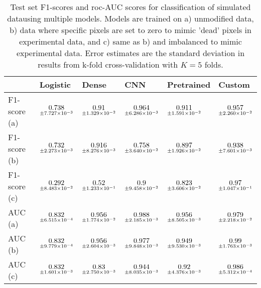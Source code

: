 \begin{table}
\centering
\caption{
Test set F1-scores and roc-AUC scores for classification of simulated datausing multiple models.
Models are trained on a) unmodified data, b) data where specific pixels are set to zero to mimic
'dead' pixels in experimental data, and c) same as b) and imbalanced to mimic experimental data. 
Error estimates are the standard deviation in results from k-fold cross-validation with $K=5$ folds.
}
\label{tab:classification-simulated-all-f1-auc}
\begin{tabular}{llllll}
\toprule
{} &                                            Logistic &                                               Dense &                                       CNN &                                    Pretrained &                                              Custom \\
\midrule
F1-score (a) &  $\underset{\num{+- 7.727e-03 }  }{\num{ 0.738 } }$ &  $\underset{\num{+- 1.329e-02 }  }{\num{ 0.91 } }$ &  $\underset{\num{+- 6.286e-03 }  }{\num{ 0.964 } }$ &  $\underset{\num{+- 1.591e-02 }  }{\num{ 0.911 } }$ &  $\underset{\num{+- 2.260e-02 }  }{\num{ 0.957 } }$ \\
F1-score (b) &  $\underset{\num{+- 2.273e-03 }  }{\num{ 0.732 } }$ &  $\underset{\num{+- 8.276e-03 }  }{\num{ 0.916 } }$ &  $\underset{\num{+- 3.640e-02 }  }{\num{ 0.758 } }$ &  $\underset{\num{+- 1.926e-02 }  }{\num{ 0.897 } }$ &  $\underset{\num{+- 7.601e-03 }  }{\num{ 0.938 } }$ \\
F1-score (c) &  $\underset{\num{+- 8.483e-02 }  }{\num{ 0.292 } }$ &  $\underset{\num{+- 1.233e-01 }  }{\num{ 0.52 } }$ &  $\underset{\num{+- 9.458e-02 }  }{\num{ 0.9 } }$ &  $\underset{\num{+- 3.606e-02 }  }{\num{ 0.823 } }$ &  $\underset{\num{+- 1.047e-01 }  }{\num{ 0.97 } }$ \\
\midrule
AUC (a)      &  $\underset{\num{+- 6.515e-04 }  }{\num{ 0.832 } }$ &  $\underset{\num{+- 1.774e-02 }  }{\num{ 0.956 } }$ &  $\underset{\num{+- 2.185e-03 }  }{\num{ 0.988 } }$ &  $\underset{\num{+- 8.505e-03 }  }{\num{ 0.956 } }$ &  $\underset{\num{+- 2.218e-02 }  }{\num{ 0.979 } }$ \\
AUC (b)      &  $\underset{\num{+- 9.779e-04 }  }{\num{ 0.832 } }$ &  $\underset{\num{+- 2.604e-03 }  }{\num{ 0.956 } }$ &  $\underset{\num{+- 9.848e-03 }  }{\num{ 0.977 } }$ &  $\underset{\num{+- 9.530e-03 }  }{\num{ 0.949 } }$ &  $\underset{\num{+- 1.763e-03 }  }{\num{ 0.99 } }$ \\
AUC (c)      &  $\underset{\num{+- 1.601e-03 }  }{\num{ 0.832 } }$ &  $\underset{\num{+- 2.750e-03 }  }{\num{ 0.83 } }$ &  $\underset{\num{+- 8.035e-03 }  }{\num{ 0.944 } }$ &  $\underset{\num{+- 4.376e-03 }  }{\num{ 0.92 } }$ &  $\underset{\num{+- 5.312e-04 }  }{\num{ 0.986 } }$ \\
\bottomrule
\end{tabular}
\end{table}
